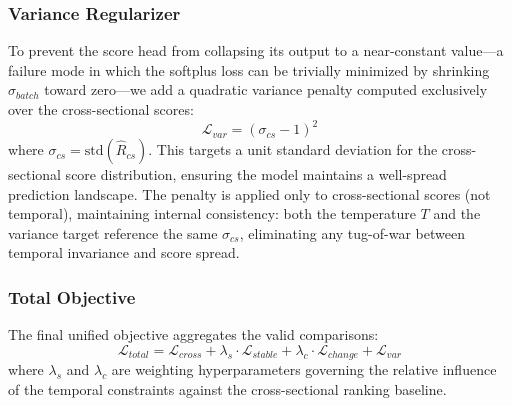 \documentclass{article}
\begin{document}
\subsubsection{Variance Regularizer}

To prevent the score head from collapsing its output to a near-constant value---a failure mode in which the softplus loss can be trivially minimized by shrinking $\sigma_{batch}$ toward zero---we add a quadratic variance penalty computed exclusively over the cross-sectional scores:
\begin{equation}
\mathcal{L}_{var} = \left(\sigma_{cs} - 1\right)^2
\end{equation}
where $\sigma_{cs} = \text{std}(\hat{R}_{cs})$. This targets a unit standard deviation for the cross-sectional score distribution, ensuring the model maintains a well-spread prediction landscape. The penalty is applied only to cross-sectional scores (not temporal), maintaining internal consistency: both the temperature $T$ and the variance target reference the same $\sigma_{cs}$, eliminating any tug-of-war between temporal invariance and score spread.

\subsubsection{Total Objective}

The final unified objective aggregates the valid comparisons:
\begin{equation}
\mathcal{L}_{total} = \mathcal{L}_{cross} + \lambda_{s} \cdot \mathcal{L}_{stable} + \lambda_{c} \cdot \mathcal{L}_{change} + \mathcal{L}_{var}
\end{equation}
where $\lambda_s$ and $\lambda_c$ are weighting hyperparameters governing the relative influence of the temporal constraints against the cross-sectional ranking baseline.
\end{document}

